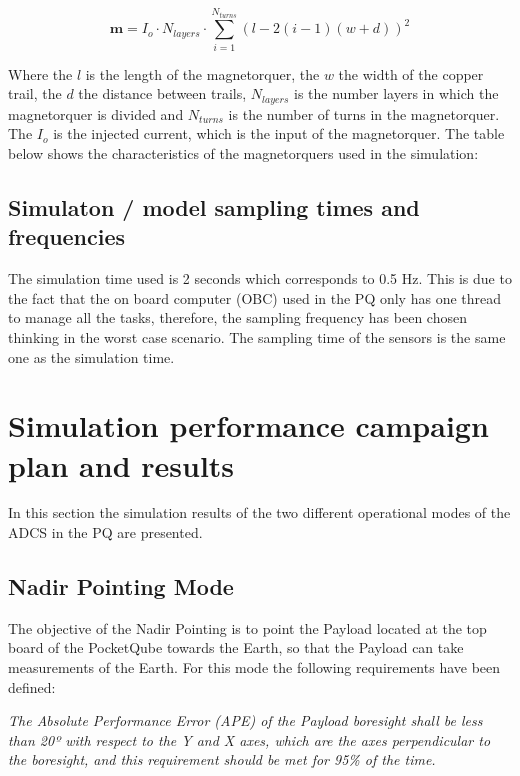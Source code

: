 \begin{equation}
    \boldsymbol{m}=I_o·N_{layers}·\sum_{i=1}^{N_{turns}}(l-2(i-1)(w+d))^2
\end{equation}

\noindent Where the $l$ is the length of the magnetorquer, the $w$ the width of the copper trail, the $d$ the distance between trails, $N_{layers}$ is the number
layers in which the magnetorquer is divided and $N_{turns}$ is the number of turns in the magnetorquer. The $I_o$ is the injected current, which is the input of the magnetorquer. 
The table below shows the characteristics of the magnetorquers used in the simulation:

\magnetorquercharacteristics



\subsection{Simulaton / model sampling times and frequencies}
The simulation time used is 2 seconds which corresponds to 0.5 Hz. This is due to the fact that the on board computer (OBC) used in the PQ
only has one thread to manage all the tasks, therefore, the sampling frequency has been chosen thinking in the worst case scenario. The 
sampling time of the sensors is the same one as the simulation time.

\section{Simulation performance campaign plan and results}

In this section the simulation results of the two different operational modes of the ADCS in the PQ are presented.

\subsection{Nadir Pointing Mode}

The objective of the Nadir Pointing is to point the Payload located at the top board of the PocketQube towards the Earth, so that 
the Payload can take measurements of the Earth. For this mode the following requirements have been defined: \vspace{1em}


\noindent \textit{The Absolute Performance Error (APE) of the Payload boresight shall be less than 20º with respect to the Y and X 
axes, which are the axes perpendicular to the boresight, and this requirement should be met for 95\% of the time.} \vspace{1em}


